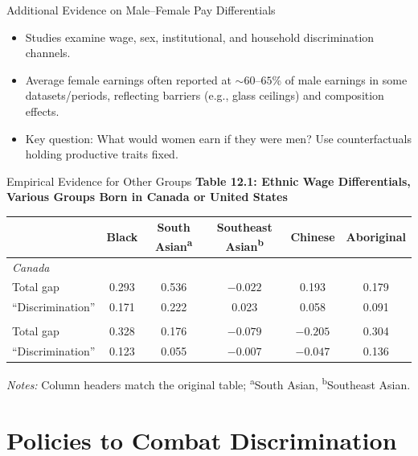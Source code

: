 \documentclass[aspectratio=169]{beamer}
\begin{document}
\begin{frame}{Additional Evidence on Male--Female Pay Differentials}
\transfade
\begin{itemize}[<+->]
  \item Studies examine wage, sex, institutional, and household discrimination channels.
  \item Average female earnings often reported at \(\sim 60\)–\(65\%\) of male earnings in some datasets/periods, reflecting barriers (e.g., glass ceilings) and composition effects.
  \item Key question: \alert{What would women earn if they were men?} Use counterfactuals holding productive traits fixed.
\end{itemize}
\end{frame}

\begin{frame}{Empirical Evidence for Other Groups}
\transfade
\scriptsize
\textbf{Table 12.1: Ethnic Wage Differentials, Various Groups Born in Canada or United States}
\medskip

\begin{tabular}{lccccc}
\toprule
 & \textbf{Black} & \textbf{South Asian\textsuperscript{a}} & \textbf{Southeast Asian\textsuperscript{b}} & \textbf{Chinese} & \textbf{Aboriginal} \\
\midrule
\multicolumn{6}{l}{\textit{Canada}} \\
Total gap & 0.293 & 0.536 & $-0.022$ & 0.193 & 0.179 \\
``Discrimination'' & 0.171 & 0.222 & 0.023 & 0.058 & 0.091 \\
\addlinespace[0.25em]
\multicolumn{6}{l}{\textit{United States}} \\
Total gap & 0.328 & 0.176 & $-0.079$ & $-0.205$ & 0.304 \\
``Discrimination'' & 0.123 & 0.055 & $-0.007$ & $-0.047$ & 0.136 \\
\bottomrule
\end{tabular}

\medskip
\scriptsize \textit{Notes:} Column headers match the original table; \textsuperscript{a}South Asian, \textsuperscript{b}Southeast Asian.
\end{frame}

\section{Policies to Combat Discrimination}
\end{document}
